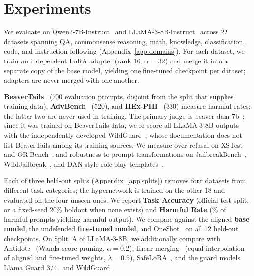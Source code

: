 \section{Experiments}
\label{sec:experiments}

 We evaluate on Qwen2-7B-Instruct~\citep{yang2024qwen2} and LLaMA-3-8B-Instruct~\citep{dubey2024llama} across 22 datasets spanning QA, commonsense reasoning, math, knowledge, classification, code, and instruction-following (Appendix~\ref{app:domains}). For each dataset, we train an independent LoRA adapter (rank 16, $\alpha{=}32$) and merge it into a separate copy of the base model, yielding one fine-tuned checkpoint per dataset; adapters are never merged with one another.

\textbf{BeaverTails}~\citep{ji2024beavertails} (700 evaluation prompts, disjoint from the split that supplies \ssn{} training data), \textbf{AdvBench}~\citep{zou2023universal} (520), and \textbf{HEx-PHI}~\citep{qi2024finetuning} (330) measure harmful rates; the latter two are never used in training. The primary judge is beaver-dam-7b~\citep{ji2024beavertails}; since it was trained on BeaverTails data, we re-score all LLaMA-3-8B outputs with the independently developed WildGuard~\citep{han2024wildguard}, whose documentation does not list BeaverTails among its training sources. We measure over-refusal on XSTest~\citep{rottger2024xstest} and OR-Bench~\citep{cui2025orbench}, and robustness to prompt transformations on JailbreakBench~\citep{chao2024jailbreakbench}, WildJailbreak~\citep{jiang2024wildteaming}, and DAN-style role-play templates~\citep{shen2024dan}.

Each of three held-out splits (Appendix~\ref{app:splits}) removes four datasets from different task categories; the hypernetwork is trained on the other 18 and evaluated on the four unseen ones. We report \textbf{Task Accuracy} (official test split, or a fixed-seed 20\% holdout when none exists) and \textbf{Harmful Rate} (\% of harmful prompts yielding harmful output). We compare against the aligned \textbf{base model}, the undefended \textbf{fine-tuned model}, and OneShot~\citep{zhang2026safety} on all 12 held-out checkpoints. On Split~A of LLaMA-3-8B, we additionally compare with Antidote~\citep{huang2025antidote} (Wanda-score pruning, $\alpha{=}0.2$), linear merging~\citep{farn2025safeguard} (equal interpolation of aligned and fine-tuned weights, $\lambda{=}0.5$), SafeLoRA~\citep{hsu2024safe}, and the guard models Llama Guard 3/4~\citep{dubey2024llama,meta2025llama4} and WildGuard.

